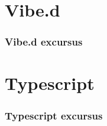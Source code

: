 \documentclass[notes,xelatex,13pt]{beamer}
\begin{document}
\section{Vibe.d}
\begin{frame}
	\frametitle{Vibe.d excursus}
\end{frame}

\section{Typescript}
\begin{frame}
	\frametitle{Typescript excursus}
\end{frame}
\end{document}
